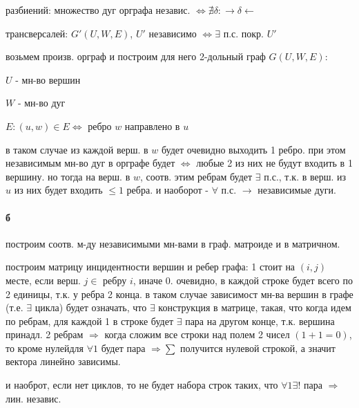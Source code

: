\documentclass[russian]{article}
\begin{document}
разбиений: множество дуг орграфа независ. $\iff \nexists \delta : \to \delta \leftarrow$

трансверсалей: $G'(U,W,E)$, $U'$ независимо $\iff \exists $ п.с. покр. $U'$

возьмем произв. орграф и построим для него 2-дольный граф $G(U,W,E)$:

$U$ - мн-во вершин

$W$ - мн-во дуг

$E:(u,w) \in E \iff $ ребро $w$ направлено в $u$

в таком случае из каждой верш. в $w$ будет очевидно выходить 1 ребро. при этом независимым мн-во дуг в орграфе будет $\iff$ любые 2 из них не будут входить в 1 вершину. но тогда на верш. в $w$, соотв. этим ребрам будет $\exists$ п.с., т.к. в верш. из $u$ из них будет входить $\le 1$ ребра. и наоборот - $\forall$ п.с. $\to$ независимые дуги.

\paragraph{б}

построим соотв. м-ду независимыми мн-вами в граф. матроиде и в матричном.

построим матрицу инцидентности вершин и ребер графа: 1 стоит на $(i,j)$ месте, если верш. $j \in $ ребру $i$, иначе 0. очевидно, в каждой строке будет всего по 2 единицы, т.к. у ребра 2 конца. в таком случае зависимост мн-ва вершин в графе (т.е. $\exists$ цикла) будет означать, что $\exists$ конструкция в матрице, такая, что когда идем по ребрам, для каждой 1 в строке будет $\exists$ пара на другом конце, т.к. вершина принадл. 2 ребрам $\Rightarrow$ когда сложим все строки над полем 2 чисел $(1+1=0)$, то  кроме нулейдля $\forall 1$ будет пара $\Rightarrow \sum$ получится нулевой строкой, а значит вектора линейно зависимы.

и наоброт, если нет циклов, то не будет набора строк таких, что $\forall 1 \exists ! $ пара $\Rightarrow $ лин. независ.
\end{document}
